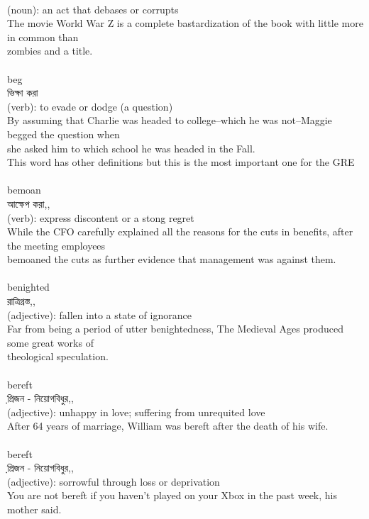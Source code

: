 \documentclass{article}
\begin{document}
{}\\
{(noun): an act that debases or corrupts\\The movie World War Z is a complete bastardization of the book with little more in common than\\zombies and a title.\\}\\
{beg}\\
{ভিক্ষা করা}\\
{(verb): to evade or dodge (a question)\\By assuming that Charlie was headed to college--which he was not--Maggie begged the question when\\she asked him to which school he was headed in the Fall.\\This word has other definitions but this is the most important one for the GRE\\}\\
{bemoan}\\
{আক্ষেপ করা,,}\\
{(verb): express discontent or a stong regret\\While the CFO carefully explained all the reasons for the cuts in benefits, after the meeting employees\\bemoaned the cuts as further evidence that management was against them.\\}\\
{benighted}\\
{রাত্রিগ্রস্ত,,}\\
{(adjective): fallen into a state of ignorance\\Far from being a period of utter benightedness, The Medieval Ages produced some great works of\\theological speculation.\\}\\
{bereft}\\
{প্রি়জন - নিয়োগবিধুর,,}\\
{(adjective): unhappy in love; suffering from unrequited love\\After 64 years of marriage, William was bereft after the death of his wife.\\}\\
{bereft}\\
{প্রি়জন - নিয়োগবিধুর,,}\\
{(adjective): sorrowful through loss or deprivation\\You are not bereft if you haven't played on your Xbox in the past week, his mother said.\\}\\
\end{document}
